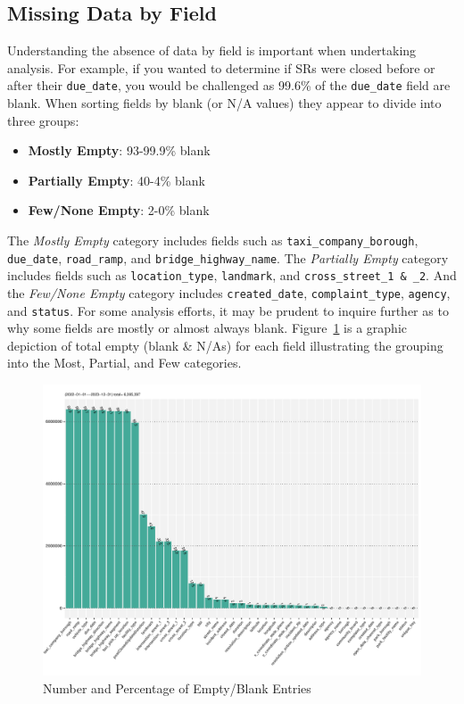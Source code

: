 \documentclass[linenumber]{jdsart}
\begin{document}
\subsection{Missing Data by Field}
\label{sec:blanks}
Understanding the absence of data by field is important 
when undertaking analysis. For example, if you wanted to 
determine if SRs were closed before or after their
\texttt{due\_date}, you would be challenged as 99.6\% of the
\texttt{due\_date} field are blank. When sorting fields by
blank (or N/A values) they appear to divide into three groups:

\begin{itemize}[left=1.5em]
    \item \textbf{Mostly Empty}: 93-99.9\% blank 
    \item \textbf{Partially Empty}: 40-4\% blank
    \item \textbf{Few/None Empty}: 2-0\% blank
\end{itemize}

The \textit{Mostly Empty} category includes fields such as
\texttt{taxi\_company\_borough}, \texttt{due\_date},
\texttt{road\_ramp}, and \texttt{bridge\_highway\_name}.
The \textit{Partially Empty} category includes fields such as
\texttt{location\_type}, \texttt{landmark}, 
and \texttt{cross\_street\_1 \& \_2}. And the \textit{Few/None Empty} 
category includes \texttt{created\_date}, \texttt{complaint\_type},
\texttt{agency}, and \texttt{status}. For some analysis efforts, it may be
prudent to inquire further as to why some fields are 
mostly or almost always blank. Figure~\ref{fig:blank_fields} is 
a graphic depiction of total empty (blank \& N/As) for each field illustrating
the grouping into the Most, Partial, and Few categories.

\begin{figure}[tbp]
	\centering
  	\includegraphics[width=\textwidth]{BlankFields.pdf}
	\caption{Number and Percentage of Empty/Blank Entries}
	\label{fig:blank_fields}
\end{figure}
\end{document}
